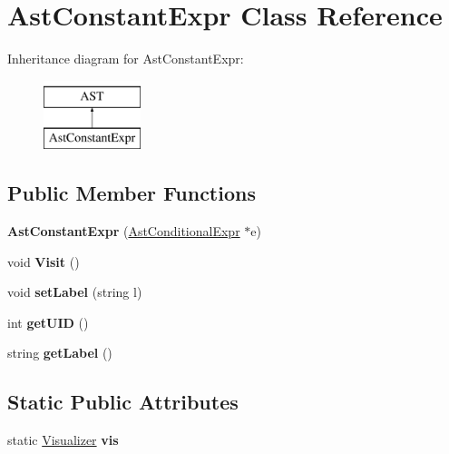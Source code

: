 \hypertarget{classAstConstantExpr}{\section{Ast\-Constant\-Expr Class Reference}
\label{classAstConstantExpr}
}
Inheritance diagram for Ast\-Constant\-Expr\-:\begin{figure}[H]
\begin{center}
\leavevmode
\includegraphics[height=2.000000cm]{classAstConstantExpr}
\end{center}
\end{figure}
\subsection*{Public Member Functions}
\begin{DoxyCompactItemize}
\item 
\hypertarget{classAstConstantExpr_a7a8c30ee91b9addfab3d0df85f9ebc30}{{\bfseries Ast\-Constant\-Expr} (\hyperlink{classAstConditionalExpr}{Ast\-Conditional\-Expr} $\ast$e)}\label{classAstConstantExpr_a7a8c30ee91b9addfab3d0df85f9ebc30}

\item 
\hypertarget{classAstConstantExpr_a355fbc35bcfa038875468e127527a597}{void {\bfseries Visit} ()}\label{classAstConstantExpr_a355fbc35bcfa038875468e127527a597}

\item 
\hypertarget{classAST_a71d680856e95ff89f55d5311a552eba6}{void {\bfseries set\-Label} (string l)}\label{classAST_a71d680856e95ff89f55d5311a552eba6}

\item 
\hypertarget{classAST_ab7a5b1d9f1c2de0d98deb356f724a42c}{int {\bfseries get\-U\-I\-D} ()}\label{classAST_ab7a5b1d9f1c2de0d98deb356f724a42c}

\item 
\hypertarget{classAST_aee029be902fffc927d16ccb03eb922ad}{string {\bfseries get\-Label} ()}\label{classAST_aee029be902fffc927d16ccb03eb922ad}

\end{DoxyCompactItemize}
\subsection*{Static Public Attributes}
\begin{DoxyCompactItemize}
\item 
\hypertarget{classAST_aca9e6637209b31e03a09c0d42f29bdfa}{static \hyperlink{classVisualizer}{Visualizer} {\bfseries vis}}\label{classAST_aca9e6637209b31e03a09c0d42f29bdfa}

\end{DoxyCompactItemize}

